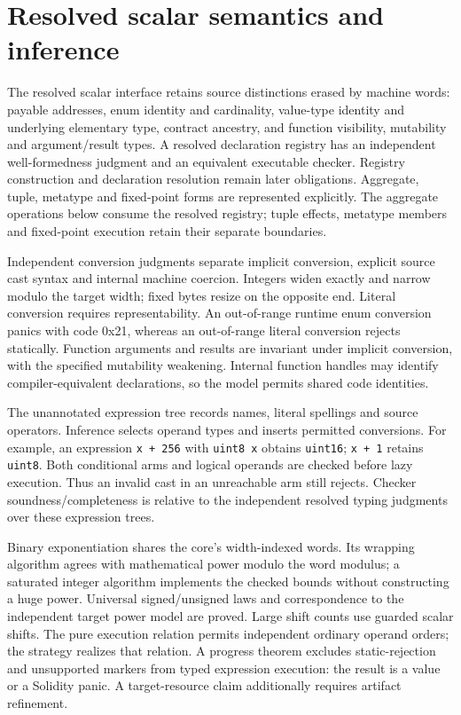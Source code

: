 \documentclass[conference]{IEEEtran}
\newcommand{\code}[1]{\texttt{#1}}
\begin{document}
\section{Resolved scalar semantics and inference}
The resolved scalar interface retains source distinctions erased by machine words:
payable addresses, enum identity and cardinality, value-type identity and
underlying elementary type, contract ancestry, and function visibility,
mutability and argument/result types. A resolved declaration registry has an
independent well-formedness judgment and an equivalent executable checker.
Registry construction and declaration resolution remain later obligations.
Aggregate, tuple, metatype and fixed-point forms are represented explicitly.
The aggregate operations below consume the resolved registry; tuple effects,
metatype members and fixed-point execution retain their separate boundaries.

Independent conversion judgments separate implicit conversion, explicit
source cast syntax and internal machine coercion. Integers widen exactly and
narrow modulo the target width; fixed bytes resize on the opposite end.
Literal conversion requires representability. An out-of-range runtime enum
conversion panics with code 0x21, whereas an out-of-range literal conversion
rejects statically. Function arguments and results are invariant under implicit
conversion, with the specified mutability weakening. Internal function handles
may identify compiler-equivalent declarations, so the model permits shared
code identities.

The unannotated expression tree records names, literal spellings and source
operators. Inference selects operand types and inserts permitted conversions.
For example, an expression \code{x + 256} with \code{uint8 x} obtains
\code{uint16}; \code{x + 1} retains \code{uint8}. Both conditional arms and
logical operands are checked before lazy execution. Thus an invalid cast in
an unreachable arm still rejects. Checker soundness/completeness is relative
to the independent resolved typing judgments over these expression trees.

Binary exponentiation shares the core's width-indexed words. Its wrapping
algorithm agrees with mathematical power modulo the word modulus; a saturated
integer algorithm implements the checked bounds without constructing a huge
power. Universal signed/unsigned laws and correspondence to the independent
target power model are proved. Large shift counts use guarded scalar shifts.
The pure execution relation permits independent ordinary operand orders; the
strategy realizes that relation. A progress theorem excludes static-rejection
and unsupported markers from typed expression execution: the result is a value
or a Solidity panic. A target-resource claim additionally requires artifact
refinement.
\end{document}
